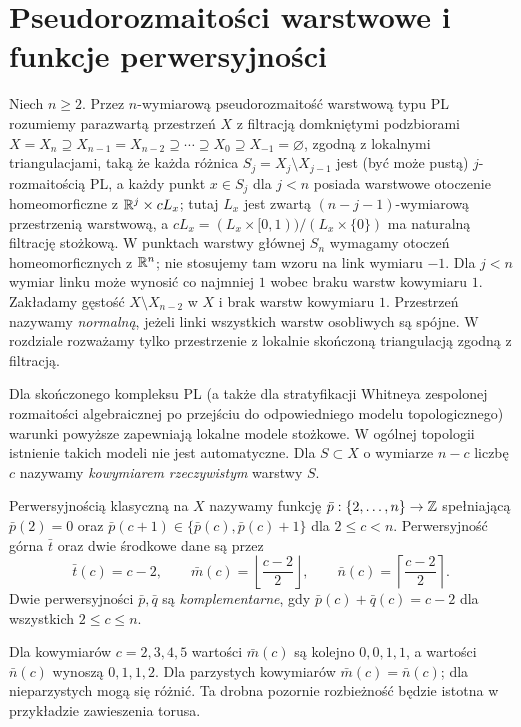 \section{Pseudorozmaitości warstwowe i funkcje perwersyjności}
\begin{definicja}
\label{def:pseudomanifold-xiii}
Niech $n\ge2$. Przez $n$-wymiarową pseudorozmaitość
warstwową typu PL rozumiemy parazwartą przestrzeń $X$
z filtracją domkniętymi podzbiorami
$X=X_n\supseteq X_{n-1}=X_{n-2}\supseteq\cdots\supseteq X_0
\supseteq X_{-1}=\varnothing$, zgodną z lokalnymi
triangulacjami, taką że każda różnica
$S_j=X_j\setminus X_{j-1}$ jest (być może pustą)
$j$-rozmaitością PL, a każdy punkt $x\in S_j$ dla $j<n$ posiada
warstwowe otoczenie homeomorficzne z
$\mathbb{R}^j\times cL_x$; tutaj $L_x$ jest zwartą
$(n-j-1)$-wymiarową przestrzenią warstwową,
a $cL_x=(L_x\times[0,1))/(L_x\times\{0\})$
ma naturalną filtrację stożkową. W punktach warstwy
głównej $S_n$ wymagamy otoczeń homeomorficznych
z $\mathbb{R}^n$; nie stosujemy tam wzoru na link
wymiaru $-1$. Dla $j<n$ wymiar linku może wynosić
co najmniej $1$ wobec braku warstw kowymiaru $1$. Zakładamy gęstość
$X\setminus X_{n-2}$ w $X$ i brak warstw kowymiaru $1$.
Przestrzeń nazywamy \emph{normalną}, jeżeli linki
wszystkich warstw osobliwych są spójne. W rozdziale
rozważamy tylko przestrzenie z lokalnie skończoną
triangulacją zgodną z filtracją.
\end{definicja}
\begin{uwaga}
Dla skończonego kompleksu PL (a także dla stratyfikacji
Whitneya zespolonej rozmaitości algebraicznej po przejściu
do odpowiedniego modelu topologicznego) warunki powyższe
zapewniają lokalne modele stożkowe. W ogólnej topologii
istnienie takich modeli nie jest automatyczne.
Dla $S\subset X$ o wymiarze $n-c$ liczbę $c$ nazywamy
\emph{kowymiarem rzeczywistym} warstwy $S$.
\end{uwaga}

\begin{definicja}
\label{def:perversity-xiii}
Perwersyjnością klasyczną na $X$ nazywamy funkcję
$\bar p:\{2,\ldots,n\}\to\mathbb{Z}$ spełniającą
$\bar p(2)=0$ oraz
$\bar p(c+1)\in\{\bar p(c),\bar p(c)+1\}$
dla $2\le c<n$. Perwersyjność górna $\bar t$
oraz dwie środkowe dane są przez
\[
\bar t(c)=c-2,\qquad
\bar m(c)=\left\lfloor\frac{c-2}{2}\right\rfloor,
\qquad
\bar n(c)=\left\lceil\frac{c-2}{2}\right\rceil.
\]
Dwie perwersyjności $\bar p,\bar q$ są
\emph{komplementarne}, gdy $\bar p(c)+\bar q(c)=c-2$
dla wszystkich $2\le c\le n$.
\end{definicja}
\begin{przyklad}
Dla kowymiarów $c=2,3,4,5$ wartości $\bar m(c)$
są kolejno $0,0,1,1$, a wartości $\bar n(c)$
wynoszą $0,1,1,2$. Dla parzystych kowymiarów
$\bar m(c)=\bar n(c)$; dla nieparzystych mogą się
różnić. Ta drobna pozornie rozbieżność będzie istotna
w przykładzie zawieszenia torusa.
\end{przyklad}

